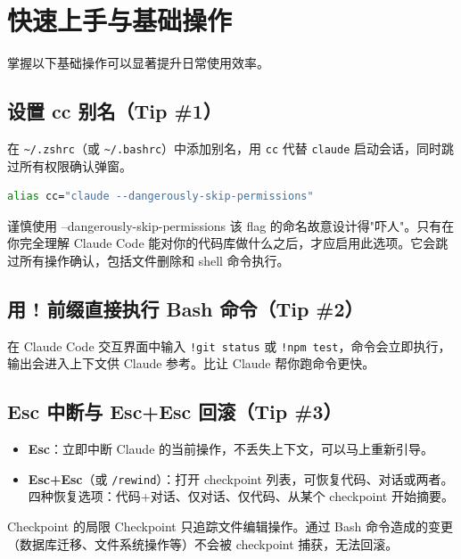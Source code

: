 \section{快速上手与基础操作}

掌握以下基础操作可以显著提升日常使用效率。

\subsection{设置 cc 别名（Tip \#1）}

在 \texttt{\textasciitilde/.zshrc}（或 \texttt{\textasciitilde/.bashrc}）中添加别名，用 \texttt{cc} 代替 \texttt{claude} 启动会话，同时跳过所有权限确认弹窗。

\begin{lstlisting}[caption={cc 别名配置}, language=bash]
alias cc="claude --dangerously-skip-permissions"
\end{lstlisting}

\begin{warningbox}{谨慎使用 --dangerously-skip-permissions}
该 flag 的命名故意设计得"吓人"。只有在你完全理解 Claude Code 能对你的代码库做什么之后，才应启用此选项。它会跳过所有操作确认，包括文件删除和 shell 命令执行。
\end{warningbox}

\subsection{用 ! 前缀直接执行 Bash 命令（Tip \#2）}

在 Claude Code 交互界面中输入 \texttt{!git status} 或 \texttt{!npm test}，命令会立即执行，输出会进入上下文供 Claude 参考。比让 Claude 帮你跑命令更快。

\subsection{Esc 中断与 Esc+Esc 回滚（Tip \#3）}

\begin{itemize}
  \item \textbf{Esc}：立即中断 Claude 的当前操作，不丢失上下文，可以马上重新引导。
  \item \textbf{Esc+Esc}（或 \texttt{/rewind}）：打开 checkpoint 列表，可恢复代码、对话或两者。四种恢复选项：代码+对话、仅对话、仅代码、从某个 checkpoint 开始摘要。
\end{itemize}

\begin{importantbox}{Checkpoint 的局限}
Checkpoint 只追踪文件编辑操作。通过 Bash 命令造成的变更（数据库迁移、文件系统操作等）不会被 checkpoint 捕获，无法回滚。
\end{importantbox}

